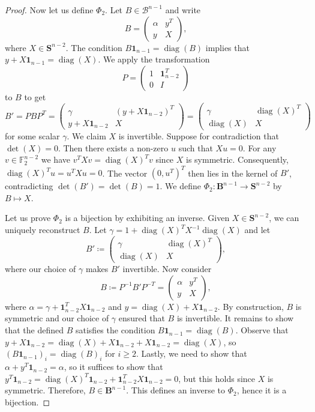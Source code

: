 \documentclass{amsart}
\theoremstyle{definition}
\theoremstyle{remark}
\def\FF{\mathbb{F}}
\def\S{\boldsymbol{S}}
\def\B{\boldsymbol{B}}
\DeclareMathOperator{\diag}{diag}
\newcommand{\Ones}{\mathbf{1}}
\begin{document}
\begin{proof}
    Now let us define $\Phi_2$. Let $B \in \mathcal{B}^{n-1}$ and write 
    \[
        B = \left( \begin{array}{c|c} \alpha & y^T \\\hline y & X \end{array}\right),
    \]
    where $X\in \S^{n-2}$. The condition $B\Ones_{n-1} = \diag(B)$ implies that $y + X\Ones_{n-1} = \diag(X)$. We apply the transformation 
    \[
        P = \left(\begin{array}{c|c} 1 & \Ones_{n-2}^T \\\hline 0 & I \end{array}\right)
    \]
    to $B$ to get
    \[
        B' = P B P^T = \left(\begin{array}{c|c} \gamma & (y+X\Ones_{n-2})^T \\\hline y+X\Ones_{n-2} & X \end{array}\right) = \left(\begin{array}{c|c} \gamma & \diag(X)^T \\\hline \diag(X) & X \end{array}\right) 
    \]
    for some scalar $\gamma$. We claim $X$ is invertible. Suppose for contradiction that $\det(X)=0$. Then there exists a non-zero $u$ such that $Xu=0$. For any $v\in \FF_2^{n-2}$ we have $v^T X v =\diag(X)^T v$ since $X$ is symmetric. Consequently, $\diag(X)^T u = u^T X u = 0$. The vector $(0, u^T)^T$ then lies in the kernel of $B'$, contradicting $\det(B')=\det(B)=1$. We define $\Phi_2: \B^{n-1} \to \S^{n-2}$ by $B\mapsto X$.
    
    Let us prove $\Phi_2$ is a bijection by exhibiting an inverse. Given $X \in \S^{n-2}$, we can uniquely reconstruct $B$. Let $\gamma = 1 + \diag(X)^T X^{-1} \diag(X)$ and let 
    \[
        B' \coloneqq \left( \begin{array}{c|c} \gamma & \diag(X)^T \\\hline \diag(X) & X \end{array}\right),
    \]
    where our choice of $\gamma$ makes $B'$ invertible. Now consider $$B \coloneqq P^{-1} B' P^{-T}= \left(\begin{array}{c|c} \alpha & y^T \\\hline y & X \end{array}\right),$$ where $\alpha = \gamma + \Ones_{n-2}^T X \Ones_{n-2}$ and $y = \diag(X) + X\Ones_{n-2}$. By construction, $B$ is symmetric and our choice of $\gamma$ ensured that $B$ is invertible. It remains to show that the defined $B$ satisfies the condition $B\Ones_{n-1} = \diag(B)$. Observe that $y + X\Ones_{n-2} = \diag(X) + X\Ones_{n-2} + X\Ones_{n-2} = \diag(X)$, so $(B\Ones_{n-1})_i = \diag(B)_i$ for $i \geq 2$. Lastly, we need to show that $\alpha + y^T \Ones_{n-2} = \alpha$, so it suffices to show that $y^T \Ones_{n-2} = \diag(X)^T \Ones_{n-2} + \Ones_{n-2}^T X \Ones_{n-2} = 0$, but this holds since $X$ is symmetric. Therefore, $B \in \B^{n-1}$. This defines an inverse to $\Phi_2$, hence it is a bijection. 
\end{proof}
\end{document}
